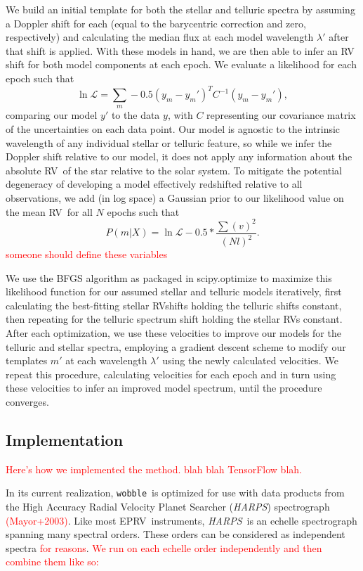 \documentclass[twocolumn]{aastex62}
\newcommand{\todo}[1]{\textcolor{red}{#1}}  %
\newcommand{\acronym}[1]{{\small{#1}}}
\newcommand{\project}[1]{\textsl{#1}}
\newcommand{\code}[1]{\texttt{#1}}
\newcommand{\HARPS}{\project{\acronym{HARPS}}}
\newcommand{\RV}{\acronym{RV}}
\newcommand{\EPRV}{\acronym{EPRV}}
\newcommand{\wobble}{\code{wobble}}
\begin{document}
We build an initial template for both the stellar and telluric spectra by assuming a Doppler shift for each (equal to the barycentric correction and zero, respectively) and calculating the median flux at each model wavelength $\lambda'$ after that shift is applied.
With these models in hand, we are then able to infer an RV shift for both model components at each epoch.
We evaluate a likelihood for each epoch such that
$$ \ln \mathcal{L} = \sum_{m} -0.5 (y_m - y_m')^T C^{-1} (y_m-y_m'),
$$
comparing our model $y'$ to the data $y$, with $C$ representing our covariance matrix of the uncertainties on each data point.
Our model is agnostic to the intrinsic wavelength of any individual stellar or telluric feature, so while we infer the  Doppler shift relative to our model, it does not apply any information about the absolute \RV\ of the star relative to the solar system. 
To mitigate the potential degeneracy of developing a model effectively redshifted relative to all observations, we add (in log space) a Gaussian prior to our likelihood value on the mean \RV\ for all $N$ epochs such that
$$ P(m|X) = \ln \mathcal{L}  -0.5 * \frac{\sum(v)^2}{(Nl)^2}.
$$
\todo{someone should define these variables}

We use the BFGS algorithm %
as packaged in scipy.optimize %
to maximize this likelihood function for our assumed stellar and telluric models iteratively, first calculating the best-fitting stellar \RV shifts holding the telluric shifts constant, then repeating for the telluric spectrum shift holding the stellar \RV s constant.
After each optimization, we use these velocities to improve our models for the telluric and stellar spectra, employing a gradient descent scheme to modify our templates $m'$ at each wavelength $\lambda'$ using the newly calculated velocities.
We repeat this procedure, calculating velocities for each epoch and in turn using these velocities to infer an improved model spectrum, until the procedure converges.

\subsection{Implementation}

\todo{Here's how we implemented the method. blah blah TensorFlow blah.}

In its current realization, \wobble\ is optimized for use with data products from the High Accuracy Radial Velocity Planet Searcher (\HARPS) spectrograph \todo{(Mayor+2003)}. Like most \EPRV\ instruments, \HARPS\ is an echelle spectrograph spanning many spectral orders. These orders can be considered as independent spectra \todo{for reasons}. \todo{We run on each echelle order independently and then combine them like so:}
\end{document}
